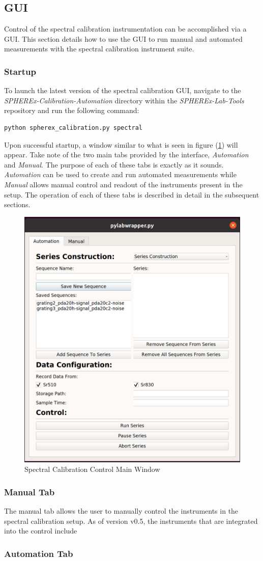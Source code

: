 \documentclass{article}
\newcommand{\version}{v0.5}
\begin{document}
\subsection{GUI}
  Control of the spectral calibration instrumentation can be accomplished via a GUI. This section details how to use the GUI to run manual and automated measurements with the spectral calibration instrument suite.

\subsubsection{Startup}

  To launch the latest version of the spectral calibration GUI, navigate to the \emph{SPHEREx-Calibration-Automation} directory within the \emph{SPHEREx-Lab-Tools} repository and run the following command:

\begin{lstlisting}[language=bash]
python spherex_calibration.py spectral
\end{lstlisting}

Upon successful startup, a window similar to what is seen in figure (\ref{spectral cal gui}) will appear. Take note of the two main tabs provided by the interface, \emph{Automation} and \emph{Manual}. The purpose of each of these tabs is exactly as it sounds. \emph{Automation} can be used to create and run automated measurements while \emph{Manual} allows manual control and readout of the instruments present in the setup. The operation of each of these tabs is described in detail in the subsequent sections.

\begin{figure}[H]
\centering
\includegraphics[width=0.5\linewidth]{./images/SpectralCalControlMainWindow.png}
\caption{Spectral Calibration Control Main Window}
\label{spectral cal gui}
\end{figure}

\subsubsection{Manual Tab}

The manual tab allows the user to manually control the instruments in the spectral calibration setup. As of version \version, the instruments that are integrated into the control include

\subsubsection{Automation Tab}
	
	
\end{document}

